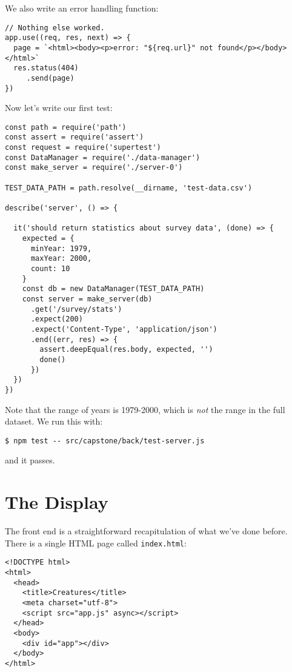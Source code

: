 \noindent
We also write an error handling function:

\begin{verbatim}
// Nothing else worked.
app.use((req, res, next) => {
  page = `<html><body><p>error: "${req.url}" not found</p></body></html>`
  res.status(404)
     .send(page)
})
\end{verbatim}

Now let's write our first test:

\begin{verbatim}
const path = require('path')
const assert = require('assert')
const request = require('supertest')
const DataManager = require('./data-manager')
const make_server = require('./server-0')

TEST_DATA_PATH = path.resolve(__dirname, 'test-data.csv')

describe('server', () => {

  it('should return statistics about survey data', (done) => {
    expected = {
      minYear: 1979,
      maxYear: 2000,
      count: 10
    }
    const db = new DataManager(TEST_DATA_PATH)
    const server = make_server(db)
      .get('/survey/stats')
      .expect(200)
      .expect('Content-Type', 'application/json')
      .end((err, res) => {
        assert.deepEqual(res.body, expected, '')
        done()
      })
  })
})
\end{verbatim}

Note that the range of years is 1979-2000,
which is \emph{not} the range in the full dataset.
We run this with:

\begin{verbatim}
$ npm test -- src/capstone/back/test-server.js
\end{verbatim}

\noindent
and it passes.

\section{The Display}\label{s:capstone-display}

The front end is a straightforward recapitulation of what we've done before.
There is a single HTML page called \texttt{index.html}:

\begin{verbatim}
<!DOCTYPE html>
<html>
  <head>
    <title>Creatures</title>
    <meta charset="utf-8">
    <script src="app.js" async></script>
  </head>
  <body>
    <div id="app"></div>
  </body>
</html>
\end{verbatim}

